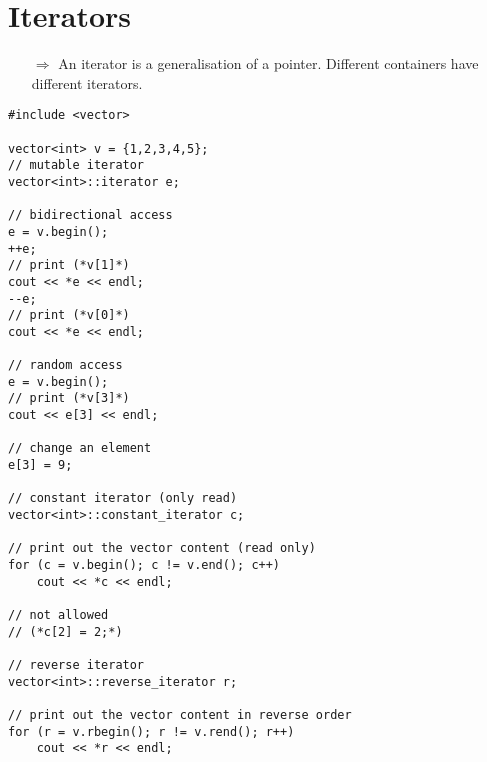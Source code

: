 \documentclass[10pt]{article}
\begin{document}
\section{Iterators}
\small
\begin{enumerate}
\item[$\Rightarrow$] An iterator is a generalisation of a pointer. Different containers have
different iterators.
\end{enumerate}
\begin{lstlisting}
#include <vector>

vector<int> v = {1,2,3,4,5};
// mutable iterator
vector<int>::iterator e;

// bidirectional access
e = v.begin();
++e;
// print (*v[1]*)
cout << *e << endl;
--e;
// print (*v[0]*)
cout << *e << endl;

// random access
e = v.begin();
// print (*v[3]*)
cout << e[3] << endl;

// change an element
e[3] = 9;

// constant iterator (only read)
vector<int>::constant_iterator c;

// print out the vector content (read only)   
for (c = v.begin(); c != v.end(); c++)
    cout << *c << endl;

// not allowed
// (*c[2] = 2;*)

// reverse iterator
vector<int>::reverse_iterator r;

// print out the vector content in reverse order
for (r = v.rbegin(); r != v.rend(); r++)
    cout << *r << endl;
\end{lstlisting}
%
%
\end{document}
